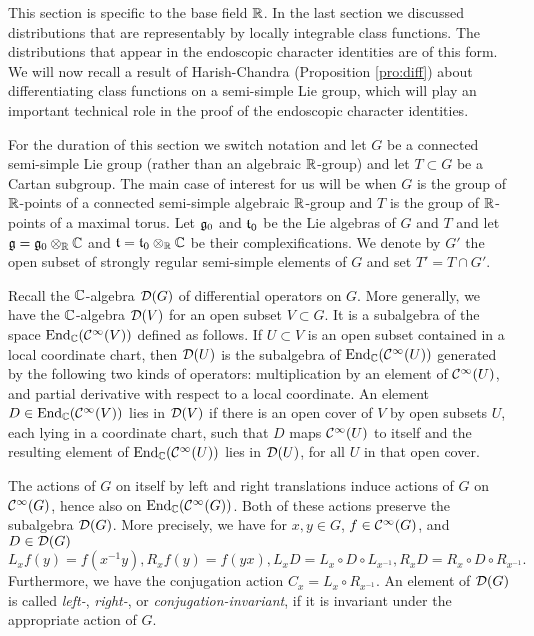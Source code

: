 \documentclass{article}
\theoremstyle{definition}
\numberwithin{equation}{section}
\renewcommand{\-}{\hyp{}}
\begin{document}
This section is specific to the base field $\mathbb{R}$. In the last section we discussed distributions that are representably by locally integrable class functions. The distributions that appear in the endoscopic character identities are of this form. We will now recall a result of Harish-Chandra (Proposition \ref{pro:diff}) about differentiating class functions on a semi-simple Lie group, which will play an important technical role in the proof of the endoscopic character identities.

For the duration of this section we switch notation and let $G$ be a connected semi-simple Lie group (rather than an algebraic $\mathbb{R}$-group) and let $T \subset G$ be a Cartan subgroup. The main case of interest for us will be when $G$ is the group of $\mathbb{R}$-points of a connected semi-simple  algebraic $\mathbb{R}$-group and $T$ is the group of $\mathbb{R}$-points of a maximal torus. Let $\mathfrak{g}_0$ and $\mathfrak{t}_0$ be the Lie algebras of $G$ and $T$ and let $\mathfrak{g}=\mathfrak{g}_0\otimes_{\mathbb{R}}\mathbb{C}$ and $\mathfrak{t}=\mathfrak{t}_0\otimes_{\mathbb{R}}\mathbb{C}$ be their complexifications. We denote by $G'$ the open subset of strongly regular semi-simple elements of $G$ and set $T'=T \cap G'$.

Recall the $\mathbb{C}$-algebra $\mathcal{D}(G)$ of differential operators on $G$. More generally, we have the $\mathbb{C}$-algebra $\mathcal{D}(V)$ for an open subset $V \subset G$. It is a subalgebra of the space $\textrm{End}_{\mathbb{C}}(\mathcal{C}^\infty(V))$ defined as follows. If $U \subset V$ is an open subset contained in a local coordinate chart, then $\mathcal{D}(U)$ is the subalgebra of $\textrm{End}_{\mathbb{C}}(\mathcal{C}^\infty(U))$ generated by the following two kinds of operators: multiplication by an element of $\mathcal{C}^\infty(U)$, and partial derivative with respect to a local coordinate. An element $D \in \textrm{End}_{\mathbb{C}}(\mathcal{C}^\infty(V))$ lies in $\mathcal{D}(V)$ if there is an open cover of $V$ by open subsets $U$, each lying in a coordinate chart, such that $D$ maps $\mathcal{C}^\infty(U)$ to itself and the resulting element of $\textrm{End}_{\mathbb{C}}(\mathcal{C}^\infty(U))$ lies in $\mathcal{D}(U)$, for all $U$ in that open cover. 

The actions of $G$ on itself by left and right translations induce actions of $G$ on $\mathcal{C}^\infty(G)$, hence also on $\textrm{End}_{\mathbb{C}}(\mathcal{C}^\infty(G))$. Both of these actions preserve the subalgebra $\mathcal{D}(G)$. More precisely, we have for $x,y \in G$, $f \in \mathcal{C}^\infty(G)$, and $D \in \mathcal{D}(G)$
\[ L_xf(y) = f(x^{-1}y), R_xf(y)=f(yx), L_xD = L_x \circ D \circ L_{x^{-1}}, R_xD = R_x \circ D \circ R_{x^{-1}}.\]
Furthermore, we have the conjugation action $C_x=L_x \circ R_{x^{-1}}$. An element of $\mathcal{D}(G)$ is called \emph{left-}, \emph{right-}, or \emph{conjugation-invariant}, if it is invariant under the appropriate action of $G$.
\end{document}
